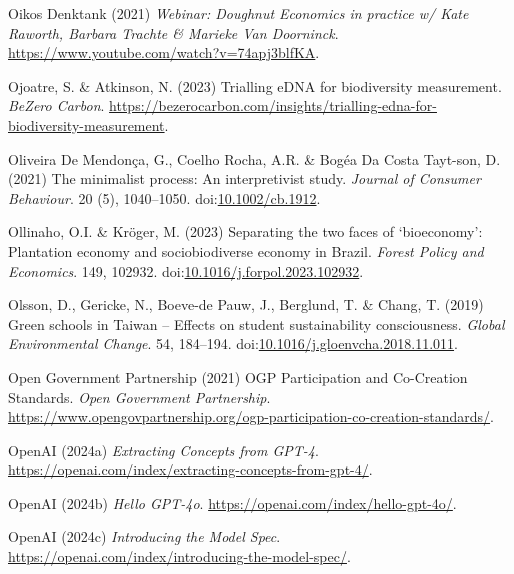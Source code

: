 \documentclass[
  letterpaper,
  DIV=11,
  numbers=noendperiod]{scrartcl}
\newlength{\cslhangindent}
\newenvironment{CSLReferences}[2] %
 {\begin{list}{}{%
  \setlength{\itemindent}{0pt}
  \setlength{\leftmargin}{0pt}
  \setlength{\parsep}{0pt}
  \ifodd #1
   \setlength{\leftmargin}{\cslhangindent}
   \setlength{\itemindent}{-1\cslhangindent}
  \fi
  \setlength{\itemsep}{#2\baselineskip}}}
 {\end{list}}
\begin{document}
\begin{CSLReferences}{0}{1}
Oikos Denktank (2021) \emph{Webinar: {Doughnut Economics} in practice w/
{Kate Raworth}, {Barbara Trachte} \& {Marieke Van Doorninck}}.
\url{https://www.youtube.com/watch?v=74apj3blfKA}.

Ojoatre, S. \& Atkinson, N. (2023) Trialling {eDNA} for biodiversity
measurement. \emph{BeZero Carbon}.
\url{https://bezerocarbon.com/insights/trialling-edna-for-biodiversity-measurement}.

Oliveira De Mendonça, G., Coelho Rocha, A.R. \& Bogéa Da Costa Tayt-son,
D. (2021) The minimalist process: {An} interpretivist study.
\emph{Journal of Consumer Behaviour}. 20 (5), 1040--1050.
doi:\href{https://doi.org/10.1002/cb.1912}{10.1002/cb.1912}.

Ollinaho, O.I. \& Kröger, M. (2023) Separating the two faces of
{`bioeconomy'}: {Plantation} economy and sociobiodiverse economy in
{Brazil}. \emph{Forest Policy and Economics}. 149, 102932.
doi:\href{https://doi.org/10.1016/j.forpol.2023.102932}{10.1016/j.forpol.2023.102932}.

Olsson, D., Gericke, N., Boeve-de Pauw, J., Berglund, T. \& Chang, T.
(2019) Green schools in {Taiwan} -- {Effects} on student sustainability
consciousness. \emph{Global Environmental Change}. 54, 184--194.
doi:\href{https://doi.org/10.1016/j.gloenvcha.2018.11.011}{10.1016/j.gloenvcha.2018.11.011}.

Open Government Partnership (2021) {OGP Participation} and {Co-Creation
Standards}. \emph{Open Government Partnership}.
\url{https://www.opengovpartnership.org/ogp-participation-co-creation-standards/}.

OpenAI (2024a) \emph{Extracting {Concepts} from {GPT-4}}.
\url{https://openai.com/index/extracting-concepts-from-gpt-4/}.

OpenAI (2024b) \emph{Hello {GPT-4o}}.
\url{https://openai.com/index/hello-gpt-4o/}.

OpenAI (2024c) \emph{Introducing the {Model Spec}}.
\url{https://openai.com/index/introducing-the-model-spec/}.


\end{CSLReferences}
\end{document}
